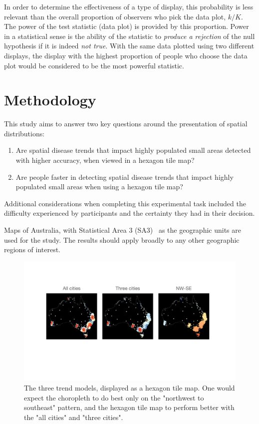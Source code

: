 \documentclass[journal]{vgtc}                     %
\begin{document}
In order to determine the effectiveness of a type of display, this probability is less relevant than the overall proportion of observers who pick the data plot, \(k/K\). The power of the test statistic (data plot) is provided by this proportion. Power in a statistical sense is the ability of the statistic to \emph{produce a rejection} of the null hypothesis if it is indeed \emph{not true}. With the same data plotted using two different displays, the display with the highest proportion of people who choose the data plot would be considered to be the most powerful statistic.

\hypertarget{methodology}{%
\section{Methodology}\label{methodology}}

This study aims to answer two key questions around the presentation of spatial distributions:

\begin{enumerate}
\def\labelenumi{\arabic{enumi}.}
\item
  Are spatial disease trends that impact highly populated small areas detected with higher accuracy, when viewed in a hexagon tile map?
\item
  Are people faster in detecting spatial disease trends that impact highly populated small areas when using a hexagon tile map?
\end{enumerate}

Additional considerations when completing this experimental task included the difficulty experienced by participants and the certainty they had in their decision.

Maps of Australia, with Statistical Area 3 (SA3)~\cite{abs2016} as the geographic units are used for the study. The results should apply broadly to any other geographic regions of interest.

\begin{figure}[h]
\centering 
  \includegraphics[width=0.9\linewidth]{figures/factors.pdf} 
\caption{The three trend models, displayed as a hexagon tile map. One would expect the choropleth to do best only on the "northwest to southeast" pattern, and the hexagon tile map to perform better with the "all cities" and "three cities".}\label{fig:factors}
\end{figure}
\end{document}
